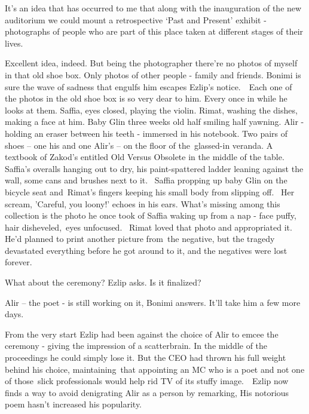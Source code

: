 \documentclass[letterpaper]{article}
\begin{document}
{\textquotedbl}It's an idea that has occurred to me that along with the inauguration of the new auditorium we could
mount a retrospective `Past and Present' exhibit {}- photographs of people who are part of this place taken at
different stages of their lives.{\textquotedbl} 

{\textquotedbl}Excellent idea, indeed. But being the photographer there're no photos of myself in that old shoe box.
Only photos of other people - family and friends.{\textquotedbl} Bonimi is sure the wave of sadness that engulfs him
escapes Ezlip's notice.\ \ Each one of the photos in the old shoe box is so very dear to him. Every once in while he
looks at them. Saffia, eyes closed, playing the violin. Rimat, washing the dishes, making a face at him. Baby Glin
three weeks old half smiling half yawning. Alir - holding an eraser between his teeth - immersed in his notebook. Two
pairs of shoes -- one his and one Alir's -- on the floor of the\ glassed-in veranda. A textbook of Zakod's entitled
{\textquotedbl}Old Versus Obsolete{\textquotedbl} in the middle of the table. Saffia's overalls hanging out to dry, his
paint-spattered ladder leaning against the wall, some cans and brushes next to it. ~Saffia propping up baby Glin on the
bicycle seat and~Rimat's fingers keeping his small body from slipping off. ~Her scream, 'Careful, you loony!' echoes in
his ears. What's missing among this collection is the photo he once took of Saffia waking up from a nap - face puffy,
hair disheveled,\textcolor[rgb]{0.0,0.4392157,0.7529412}{\ }\textcolor[rgb]{0.13333334,0.13333334,0.13333334}{eyes
unfocused.} ~Rimat loved that photo and appropriated it. He'd planned to print another picture from~the negative, but
the tragedy devastated everything before he got around to it, and the negatives were lost forever.

{\textquotedbl}What about the ceremony?{\textquotedbl} Ezlip asks. {\textquotedbl}Is it finalized?{\textquotedbl} 

{\textquotedbl}Alir -- the poet - is still working on it,{\textquotedbl} Bonimi answers. {\textquotedbl}It'll take him a
few more days.{\textquotedbl} 

From the very start Ezlip had been against the choice of Alir to emcee the ceremony - giving the impression of a
scatterbrain. In the middle of the proceedings he could simply lose it. But the CEO had thrown his full weight behind
his choice, maintaining~that appointing an MC who is a poet and not one of those~slick professionals would help rid TV
of its stuffy image.\textcolor{red}{\ }~Ezlip now finds a way to avoid denigrating Alir as a person by remarking,
{\textquotedbl}His notorious poem hasn't increased his popularity.{\textquotedbl} 
\end{document}
